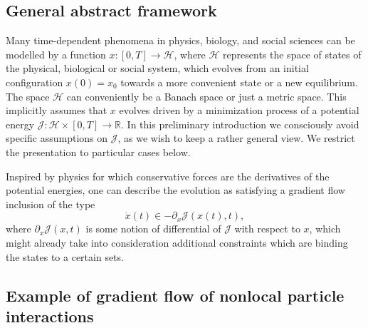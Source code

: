 
\subsection{General abstract framework}

Many time-dependent phenomena in physics, biology, and social sciences can be modelled by a function $x:[0,T] \to \mathcal H$, where $\mathcal H$ represents the space of states of the physical, biological or social system, which evolves from an initial configuration $x(0)=x_0$  towards a more convenient state or a new equilibrium. The space $\mathcal H$ can conveniently be a Banach space or just a metric space. 
This implicitly assumes that $x$ evolves driven by a minimization process of a potential energy $\mathcal J: \mathcal H \times [0,T] \to \mathbb R$.  In this preliminary introduction we consciously avoid specific assumptions on  $\mathcal J$, as we wish to keep a rather general view. We restrict the presentation to particular cases below.%

Inspired by physics for which conservative forces are the derivatives of the potential energies, one can describe the evolution as satisfying a gradient flow inclusion of the type
\begin{equation}\label{gradientflow}
\dot x(t) \in - \partial_x \mathcal J(x(t),t),
\end{equation}
where $\partial_x \mathcal J(x,t)$ is some notion of differential of $\mathcal J$ with respect to $x$, which might already take into consideration additional constraints which are binding the states to a certain sets.



\subsection{Example of gradient flow of nonlocal particle interactions}\label{sec:gradflow}


